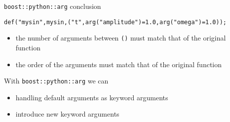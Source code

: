 \begin{frame}[fragile]{\texttt{boost::python::arg} conclusion}
    \begin{verbatim}
def("mysin",mysin,("t",arg("amplitude")=1.0,arg("omega")=1.0));
    \end{verbatim}
    \begin{itemize}
        \setlength{\itemsep}{0.05\textheight}
        \item the number of arguments between \texttt{()} must match that of
            the original function
        \item the order of the arguments must match that of the original
            function
    \end{itemize}
    \vspace{0.1\textheight}
    With \texttt{boost::python::arg} we can
    \vspace{0.05\textheight}
    \begin{itemize}
        \setlength{\itemsep}{0.05\textheight}
        \item handling default arguments as keyword arguments
        \item introduce new keyword arguments
    \end{itemize}
    
\end{frame}
